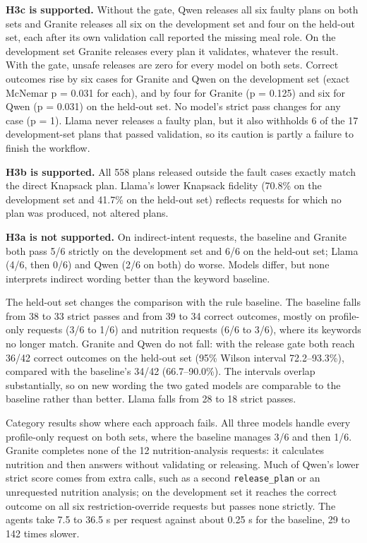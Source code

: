 \documentclass[
  10pt,
  letterpaper,
]{article}
\begin{document}
\textbf{H3c is supported.} Without the gate, Qwen releases all six
faulty plans on both sets and Granite releases all six on the
development set and four on the held-out set, each after its own
validation call reported the missing meal role. On the development set
Granite releases every plan it validates, whatever the result. With the
gate, unsafe releases are zero for every model on both sets. Correct
outcomes rise by six cases for Granite and Qwen on the development set
(exact McNemar p = 0.031 for each), and by four for Granite (p = 0.125)
and six for Qwen (p = 0.031) on the held-out set. No model's strict pass
changes for any case (p = 1). Llama never releases a faulty plan, but it
also withholds 6 of the 17 development-set plans that passed validation,
so its caution is partly a failure to finish the workflow.

\textbf{H3b is supported.} All 558 plans released outside the fault
cases exactly match the direct Knapsack plan. Llama's lower Knapsack
fidelity (70.8\% on the development set and 41.7\% on the held-out set)
reflects requests for which no plan was produced, not altered plans.

\textbf{H3a is not supported.} On indirect-intent requests, the baseline
and Granite both pass 5/6 strictly on the development set and 6/6 on the
held-out set; Llama (4/6, then 0/6) and Qwen (2/6 on both) do worse.
Models differ, but none interprets indirect wording better than the
keyword baseline.

The held-out set changes the comparison with the rule baseline. The
baseline falls from 38 to 33 strict passes and from 39 to 34 correct
outcomes, mostly on profile-only requests (3/6 to 1/6) and nutrition
requests (6/6 to 3/6), where its keywords no longer match. Granite and
Qwen do not fall: with the release gate both reach 36/42 correct
outcomes on the held-out set (95\% Wilson interval 72.2--93.3\%),
compared with the baseline's 34/42 (66.7--90.0\%). The intervals overlap
substantially, so on new wording the two gated models are comparable to
the baseline rather than better. Llama falls from 28 to 18 strict
passes.

Category results show where each approach fails. All three models handle
every profile-only request on both sets, where the baseline manages 3/6
and then 1/6. Granite completes none of the 12 nutrition-analysis
requests: it calculates nutrition and then answers without validating or
releasing. Much of Qwen's lower strict score comes from extra calls,
such as a second \texttt{release\_plan} or an unrequested nutrition
analysis; on the development set it reaches the correct outcome on all
six restriction-override requests but passes none strictly. The agents
take 7.5 to 36.5 s per request against about 0.25 s for the baseline, 29
to 142 times slower.
\end{document}
